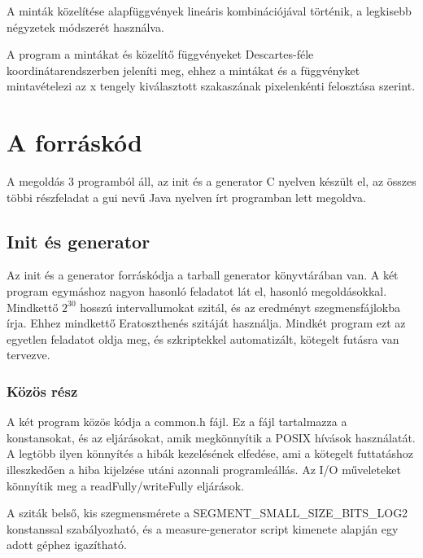 A minták közelítése alapfüggvények lineáris kombinációjával történik,
a legkisebb négyzetek módszerét használva.

A program a mintákat és közelítő függvényeket Descartes-féle koordinátarendszerben
jeleníti meg, ehhez a mintákat és a függvényket mintavételezi az x tengely
kiválasztott szakaszának pixelenkénti felosztása szerint.

\section{A forráskód}

A megoldás 3 programból áll, az init és a generator C nyelven készült el,
az összes többi részfeladat a gui nevű Java nyelven írt programban lett megoldva.

\subsection{Init és generator}

Az init és a generator forráskódja a tarball generator könyvtárában van.
A két program egymáshoz nagyon hasonló feladatot lát el, hasonló megoldásokkal.
Mindkettő $2^{30}$ hosszú intervallumokat szitál, és az eredményt szegmensfájlokba írja.
Ehhez mindkettő Eratoszthenés szitáját használja.
Mindkét program ezt az egyetlen feladatot oldja meg, és szkriptekkel automatizált, kötegelt futásra van tervezve.

\subsubsection{Közös rész}

A két program közös kódja a common.h fájl.
Ez a fájl tartalmazza a konstansokat, és az eljárásokat, amik megkönnyítik a POSIX hívások használatát.
A legtöbb ilyen könnyítés a hibák kezelésének elfedése, ami a kötegelt futtatáshoz illeszkedően
a hiba kijelzése utáni azonnali programleállás.
Az I/O műveleteket könnyítik meg a readFully/writeFully
eljárások.

A sziták belső, kis szegmensmérete a
SEGMENT\_SMALL\_SIZE\_BITS\_LOG2 konstanssal
szabályozható, és a measure-generator script
kimenete alapján egy adott géphez igazítható.


